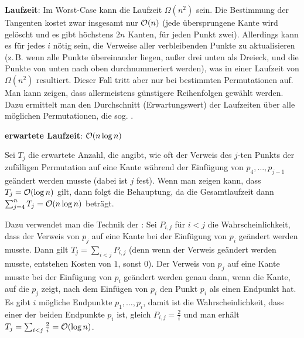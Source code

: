 \linie

\textbf{Laufzeit}:
Im Worst-Case kann die Laufzeit $\Omega(n^2)$ sein.
Die Bestimmung der Tangenten kostet zwar insgesamt nur $\mathcal{O}(n)$
(jede übersprungene Kante wird gelöscht und es gibt höchstens $2n$ Kanten, für jeden
Punkt zwei).
Allerdings kann es für jedes $i$ nötig sein, die Verweise aller verbleibenden Punkte
zu aktualisieren
(z.\,B. wenn alle Punkte übereinander liegen, außer drei unten als Dreieck, und die
Punkte von unten nach oben durchnummeriert werden),
was in einer Laufzeit von $\Omega(n^2)$ resultiert.
Dieser Fall tritt aber nur bei bestimmten Permutationen auf.
Man kann zeigen, dass allermeistens günstigere Reihenfolgen gewählt werden.
Dazu ermittelt man den Durchschnitt (Erwartungswert) der Laufzeiten über alle möglichen
Permutationen, die sog. .

\textbf{erwartete Laufzeit}:
$\mathcal{O}(n \log n)$

\begin{Beweis}
    Sei $T_j$ die erwartete Anzahl, die angibt, wie oft der Verweis des $j$-ten Punkts
    der zufälligen Permutation auf eine Kante während der Einfügung von $p_4, \dotsc, p_{j-1}$
    geändert werden musste (dabei ist $j$ fest).
    Wenn man zeigen kann, dass $T_j = \mathcal{O}(\log n)$ gilt, dann folgt die Behauptung,
    da die Gesamtlaufzeit dann $\sum_{j=4}^n T_j = \mathcal{O}(n \log n)$ beträgt.

    Dazu verwendet man die Technik der :
    Sei $P_{i,j}$ für $i < j$ die Wahrscheinlichkeit, dass der Verweis von $p_j$ auf eine Kante
    bei der Einfügung von $p_i$ geändert werden musste.
    Dann gilt $T_j = \sum_{i < j} P_{i,j}$
    (denn wenn der Verweis geändert werden musste, entstehen Kosten von $1$, sonst $0$).
    Der Verweis von $p_j$ auf eine Kante
    musste bei der Einfügung von $p_i$ geändert werden genau dann,
    wenn die Kante, auf die $p_j$ zeigt, nach dem Einfügen von $p_i$ den Punkt $p_i$ als einen
    Endpunkt hat.
    Es gibt $i$ mögliche Endpunkte $p_1, \dotsc, p_i$, damit ist die Wahrscheinlichkeit,
    dass einer der beiden Endpunkte $p_i$ ist, gleich $P_{i,j} = \frac{2}{i}$
    und man erhält $T_j = \sum_{i < j} \frac{2}{i} = \mathcal{O}(\log n)$.
\end{Beweis}

\pagebreak
